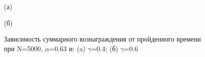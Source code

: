 \documentclass[a4paper]{report}
\theoremstyle{definition}
\theoremstyle{plain}
\theoremstyle{remark}
\theoremstyle{remark}
\theoremstyle{definition}
\begin{document}
\begin{figure}[H]
    \begin{minipage}[H]{0.49\linewidth}
        (а)\\
    \end{minipage}
    \hfill
    \begin{minipage}[H]{0.49\linewidth}
        (б)\\
    \end{minipage}
     \caption{Зависимость суммарного вознаграждения от пройденного времени при N=5000, $\alpha$=0.63 и: (a) $\gamma$=0.4; (б) $\gamma$=0.6}
\end{figure}
\end{document}
